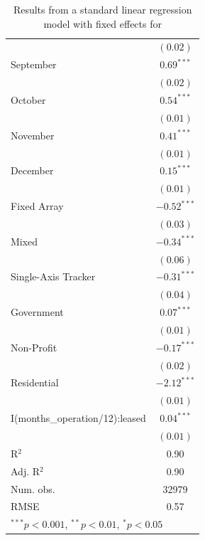 \documentclass[12pt]{article}
\begin{document}
\begin{table}
\begin{center}
\begin{tabular}{l c }
                                                       & $(0.02)$      \\
September                                         & $0.69^{***}$  \\
                                                       & $(0.02)$      \\
October                                       & $0.54^{***}$  \\
                                                       & $(0.01)$      \\
November                                       & $0.41^{***}$  \\
                                                       & $(0.01)$      \\
December                                        & $0.15^{***}$  \\
                                                       & $(0.01)$      \\
Fixed Array                            & $-0.52^{***}$ \\
                                                       & $(0.03)$      \\
Mixed                                  & $-0.34^{***}$ \\
                                                       & $(0.06)$      \\
Single-Axis Tracker                    & $-0.31^{***}$ \\
                                                       & $(0.04)$      \\
Government                               & $0.07^{***}$  \\
                                                       & $(0.01)$      \\
Non-Profit                               & $-0.17^{***}$ \\
                                                       & $(0.02)$      \\
Residential                              & $-2.12^{***}$ \\
                                                       & $(0.01)$      \\
I(months\_operation/12):leased & $0.04^{***}$  \\
                                                       & $(0.01)$      \\
\hline
R$^2$                                                  & 0.90          \\
Adj. R$^2$                                             & 0.90          \\
Num. obs.                                              & 32979         \\
RMSE                                                   & 0.57          \\
\hline
\multicolumn{2}{l}{\scriptsize{$^{***}p<0.001$, $^{**}p<0.01$, $^*p<0.05$}}
\end{tabular}
\caption{Results from a standard linear regression model with fixed effects for }
\label{table:max_likelihood}
\end{center}
\end{table} 
\end{document}
